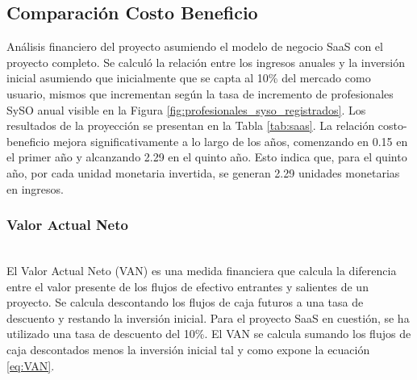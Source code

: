 \subsection{Comparación Costo Beneficio}
Análisis financiero del proyecto asumiendo el modelo de negocio SaaS con el proyecto completo. Se calculó la relación entre los ingresos anuales y la inversión inicial asumiendo que inicialmente que se capta al 10\% del mercado como usuario, mismos que incrementan según la tasa de incremento de profesionales SySO anual visible en la Figura \ref{fig:profesionales_syso_registrados}. Los resultados de la proyección se presentan en la Tabla \ref{tab:saas}. La relación costo-beneficio mejora significativamente a lo largo de los años, comenzando en 0.15 en el primer año y alcanzando 2.29 en el quinto año. Esto indica que, para el quinto año, por cada unidad monetaria invertida, se generan 2.29 unidades monetarias en ingresos.

\begin{table}[h]
    \centering
    \caption{Proyección Financiera del Modelo SaaS}
    \label{tab:saas}
\end{table}

\subsubsection{Valor Actual Neto}\hfill\\ 
\indent
El Valor Actual Neto (VAN) es una medida financiera que calcula la diferencia entre el valor presente de los flujos de efectivo entrantes y salientes de un proyecto. Se calcula descontando los flujos de caja futuros a una tasa de descuento y restando la inversión inicial. Para el proyecto SaaS en cuestión, se ha utilizado una tasa de descuento del 10\%. El VAN se calcula sumando los flujos de caja descontados menos la inversión inicial tal y como expone la ecuación \ref{eq:VAN}.

